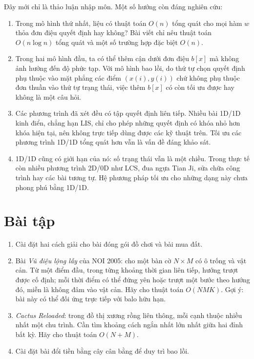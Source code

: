 \documentclass[11pt]{article}
\begin{document}
Đây mới chỉ là thảo luận nhập môn. Một số hướng còn đáng nghiên cứu:
\begin{enumerate}
  \item Trong mô hình thứ nhất, liệu có thuật toán $O(n)$ tổng quát cho mọi
  hàm $w$ thỏa đơn điệu quyết định hay không? Bài viết chỉ nêu thuật toán
  $O(n\log n)$ tổng quát và một số trường hợp đặc biệt $O(n)$.
  \item Trong hai mô hình đầu, ta có thể thêm cận dưới đơn điệu $b[x]$ mà
  không ảnh hưởng đến độ phức tạp. Với mô hình bao lồi, do thứ tự chọn quyết
  định phụ thuộc vào mặt phẳng các điểm $(x(i),y(i))$ chứ không phụ thuộc đơn
  thuần vào thứ tự trạng thái, việc thêm $b[x]$ có còn tối ưu được hay không
  là một câu hỏi.
  \item Các phương trình đã xét đều có tập quyết định liên tiếp. Nhiều bài
  1D/1D kinh điển, chẳng hạn LIS, chỉ cho phép những quyết định có khóa nhỏ
  hơn khóa hiện tại, nên không trực tiếp dùng được các kỹ thuật trên. Tối ưu
  các phương trình 1D/1D tổng quát hơn vẫn là vấn đề đáng khảo sát.
  \item 1D/1D cũng có giới hạn của nó: số trạng thái vẫn là một chiều. Trong
  thực tế còn nhiều phương trình 2D/0D như LCS, đua ngựa Tian Ji, sửa chữa
  công trình hay các bài tương tự. Hệ phương pháp tối ưu cho những dạng này
  chưa phong phú bằng 1D/1D.
\end{enumerate}

\section*{Bài tập}

\begin{enumerate}
  \item Cài đặt hai cách giải cho bài đóng gói đồ chơi và bài mua đất.
  \item Bài \emph{Vũ điệu lộng lẫy} của NOI 2005: cho một bàn cờ $N\times M$
  có ô trống và vật cản. Từ một điểm đầu, trong từng khoảng thời gian liên
  tiếp, hướng trượt được cố định; mỗi thời điểm có thể đứng yên hoặc trượt
  một bước theo hướng đó, miễn là không đâm vào vật cản. Hãy cho thuật toán
  $O(NMK)$. Gợi ý: bài này có thể đối ứng trực tiếp với balo hữu hạn.
  \item \emph{Cactus Reloaded}: trong đồ thị xương rồng liên thông, mỗi cạnh
  thuộc nhiều nhất một chu trình. Cần tìm khoảng cách ngắn nhất lớn nhất giữa
  hai đỉnh bất kỳ. Hãy cho thuật toán $O(N+M)$.
  \item Cài đặt bài đổi tiền bằng cây cân bằng để duy trì bao lồi.
\end{enumerate}
\end{document}
